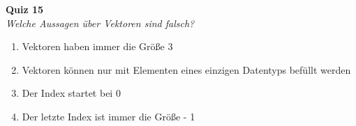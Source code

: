 \textbf{Quiz 15}\\
\textit{Welche Aussagen über Vektoren sind falsch?}
\begin{enumerate}[label=\alph*)]
	\item Vektoren haben immer die Größe 3
	\item Vektoren können nur mit Elementen eines einzigen Datentyps befüllt werden
	\item Der Index startet bei 0
	\item Der letzte Index ist immer die Größe - 1
\end{enumerate}
